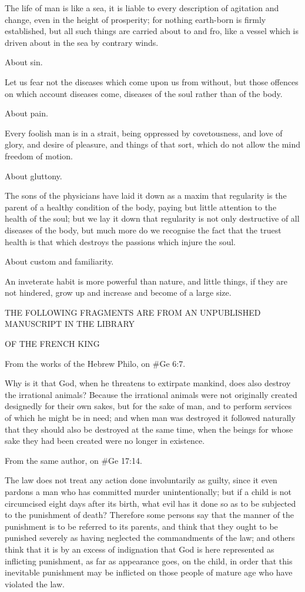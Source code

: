 The life of man is like a sea, it is liable to every description of agitation and change, even in the height
of prosperity; for nothing earth-born is firmly established, but all such things are carried about to and
fro, like a vessel which is driven about in the sea by contrary winds.

About sin.

Let us fear not the diseases which come upon us from without, but those offences on which account
diseases come, diseases of the soul rather than of the body.

About pain.

Every foolish man is in a strait, being oppressed by covetousness, and love of glory, and desire of
pleasure, and things of that sort, which do not allow the mind freedom of motion.

About gluttony.

The sons of the physicians have laid it down as a maxim that regularity is the parent of a healthy
condition of the body, paying but little attention to the health of the soul; but we lay it down that
regularity is not only destructive of all diseases of the body, but much more do we recognise the fact
that the truest health is that which destroys the passions which injure the soul.

About custom and familiarity.

An inveterate habit is more powerful than nature, and little things, if they are not hindered, grow up and
increase and become of a large size.

THE FOLLOWING FRAGMENTS ARE FROM AN UNPUBLISHED MANUSCRIPT IN THE LIBRARY

OF THE FRENCH KING

From the works of the Hebrew Philo, on \#Ge 6:7.

Why is it that God, when he threatens to extirpate mankind, does also destroy the irrational animals?
Because the irrational animals were not originally created designedly for their own sakes, but for the
sake of man, and to perform services of which he might be in need; and when man was destroyed it
followed naturally that they should also be destroyed at the same time, when the beings for whose sake
they had been created were no longer in existence.

From the same author, on \#Ge 17:14.

The law does not treat any action done involuntarily as guilty, since it even pardons a man who has
committed murder unintentionally; but if a child is not circumcised eight days after its birth, what evil
has it done so as to be subjected to the punishment of death? Therefore some persons say that the
manner of the punishment is to be referred to its parents, and think that they ought to be punished
severely as having neglected the commandments of the law; and others think that it is by an excess of
indignation that God is here represented as inflicting punishment, as far as appearance goes, on the
child, in order that this inevitable punishment may be inflicted on those people of mature age who have
violated the law.

